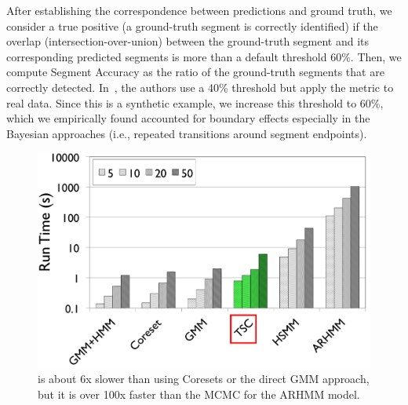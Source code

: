 After establishing the correspondence between predictions and ground truth, we consider a true positive (a ground-truth segment is correctly identified) if the overlap (intersection-over-union) between the ground-truth segment and its corresponding predicted segments is more than a default threshold 60\%.  Then, we compute \textsf{Segment Accuracy} as the ratio of the ground-truth segments that are correctly detected. In~\cite{wu2015watch}, the authors use a 40\% threshold but apply the metric to real data. Since this is a synthetic example, we increase this threshold to 60\%, which we empirically found accounted for boundary effects especially in the Bayesian approaches (i.e., repeated transitions around segment endpoints).



\begin{figure}[t]
\centering
\includegraphics[width=0.8\columnwidth]{tsc-experiments/bw_runtime.png}
\caption{\tsc is about 6x slower than using Coresets or the direct GMM approach, but it is over 100x faster than the MCMC for the ARHMM model.\label{runtime}}
\end{figure}

